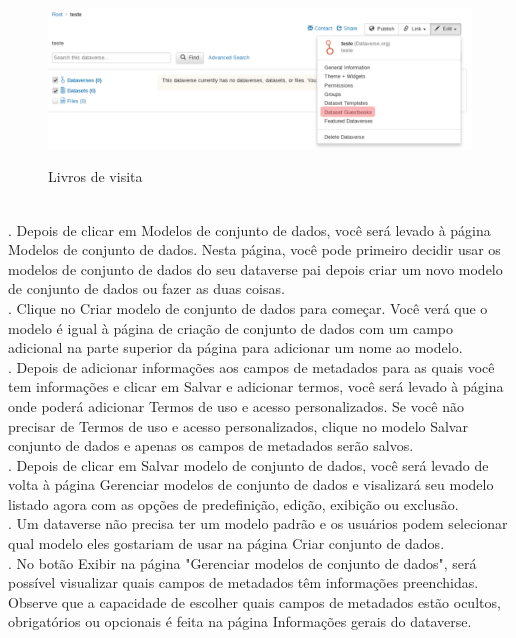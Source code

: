 \documentclass[12pt,hidelinks]{article}
\begin{document}
 \begin{figure}[H]
 \caption{Livros de visita}
\centering
    \includegraphics[width=1.0\textwidth]{Prints/pn2.png}
    \label{print7}
\end{figure}
\\

. Depois de clicar em Modelos de conjunto de dados, você será levado à página Modelos de conjunto de dados. Nesta página, você pode primeiro decidir usar os modelos de conjunto de dados do seu dataverse pai depois criar um novo modelo de conjunto de dados ou fazer as duas coisas.\\

. Clique no Criar modelo de conjunto de dados para começar. Você verá que o modelo é igual à página de criação de conjunto de dados com um campo adicional na parte superior da página para adicionar um nome ao modelo.\\

. Depois de adicionar informações aos campos de metadados para as quais você tem informações e clicar em Salvar e adicionar termos, você será levado à página onde poderá adicionar Termos de uso e acesso personalizados. Se você não precisar de Termos de uso e acesso personalizados, clique no modelo Salvar conjunto de dados e apenas os campos de metadados serão salvos.\\

. Depois de clicar em Salvar modelo de conjunto de dados, você será levado de volta à página Gerenciar modelos de conjunto de dados e visalizará seu modelo listado agora com as opções de predefinição, edição, exibição ou exclusão.\\

. Um dataverse não precisa ter um modelo padrão e os usuários podem selecionar qual modelo eles gostariam de usar na página Criar conjunto de dados.\\

. No botão Exibir na página "Gerenciar modelos de conjunto de dados", será possível visualizar quais campos de metadados têm informações preenchidas. Observe que a capacidade de escolher quais campos de metadados estão ocultos, obrigatórios ou opcionais é feita na página Informações gerais do dataverse.
    
\end{document}
